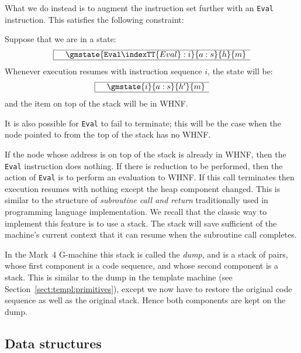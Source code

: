 What we do instead is to augment the instruction set further with an
\mbox{\tt Eval} instruction. This satisfies the following constraint:

\begin{important}
Suppose that we are in a state:
\[\begin{array}{|lrrll|}\hline
& \gmstate{\mbox{\tt Eval}\indexTT{Eval}: i}{a:s}{h}{m}\\ \hline
\end{array}\]
Whenever execution resumes with instruction sequence $i$, the state
will be:
\[\begin{array}{|lrrll|}\hline
& \gmstate{i}{a:s}{h'}{m}\\ \hline
\end{array}\]
and the item on top of the stack will be in WHNF.

It is also possible for \mbox{\tt Eval} to fail to terminate; this will be the
case when the node pointed to from the top of the stack has no WHNF.
\end{important}

If the node whose address is on top of the stack is already in WHNF,
then the \mbox{\tt Eval} instruction does nothing. If there is reduction to be
performed, then the action of \mbox{\tt Eval} is to perform an evaluation to
WHNF. If this call terminates then execution resumes with nothing
except the heap component changed.
This is similar to the structure of {\em subroutine call and
return\/} traditionally used in
programming language implementation. We recall that the classic way to
implement this feature is to use a stack. The stack will save
sufficient of the machine's current context that it can resume when
the subroutine call completes.

In the Mark~4 G-machine this stack is called the {\em
dump}, and is a stack of pairs, whose first
component is a code sequence, and whose second component is a stack.
This is similar to the dump in the template machine (see
Section~\ref{sect:templ:primitives}), except we now have to restore
the original code sequence as well as the original stack. Hence both
components are kept on the dump.

\subsection{Data structures}

